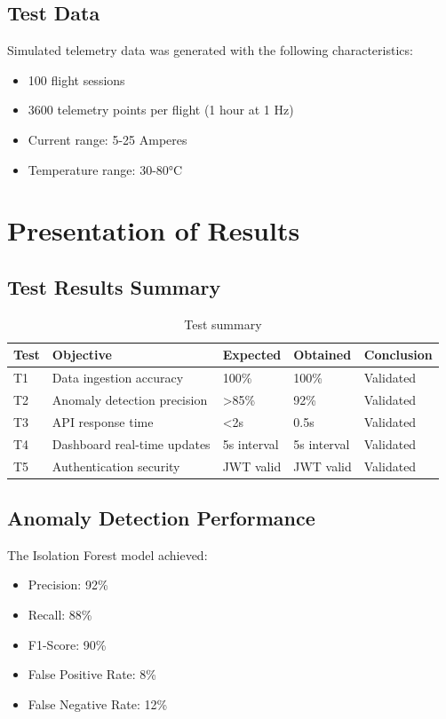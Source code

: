 \subsection{Test Data}

Simulated telemetry data was generated with the following characteristics:
\begin{itemize}
    \item 100 flight sessions
    \item 3600 telemetry points per flight (1 hour at 1 Hz)
    \item Current range: 5-25 Amperes
    \item Temperature range: 30-80°C
\end{itemize}

\section{Presentation of Results}

\subsection{Test Results Summary}

\begin{table}[H]
\centering
\caption{Test summary}
\begin{tabular}{|p{2cm}|p{4cm}|p{2cm}|p{2cm}|p{2cm}|}
\hline
\textbf{Test} & \textbf{Objective} & \textbf{Expected} & \textbf{Obtained} & \textbf{Conclusion} \\
\hline
T1 & Data ingestion accuracy & 100\% & 100\% & Validated \\
\hline
T2 & Anomaly detection precision & >85\% & 92\% & Validated \\
\hline
T3 & API response time & <2s & 0.5s & Validated \\
\hline
T4 & Dashboard real-time updates & 5s interval & 5s interval & Validated \\
\hline
T5 & Authentication security & JWT valid & JWT valid & Validated \\
\hline
\end{tabular}
\end{table}

\subsection{Anomaly Detection Performance}

The Isolation Forest model achieved:
\begin{itemize}
    \item Precision: 92\%
    \item Recall: 88\%
    \item F1-Score: 90\%
    \item False Positive Rate: 8\%
    \item False Negative Rate: 12\%
\end{itemize}

